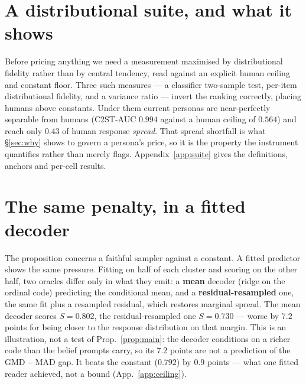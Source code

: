 \documentclass[11pt]{article}
\begin{document}
\section{A distributional suite, and what it shows}
\label{sec:suite}

Before pricing anything we need a measurement maximised by distributional
fidelity rather than by central tendency, read against an explicit human
ceiling and constant floor. Three such measures --- a classifier two-sample
test, per-item distributional fidelity, and a variance ratio --- invert the
ranking correctly, placing humans above constants. Under them current
personas are near-perfectly separable from humans (C2ST-AUC $0.994$ against
a human ceiling of $0.564$) and reach only $0.43$ of human response
\emph{spread}. That spread shortfall is what \S\ref{sec:why} shows to govern
a persona's price, so it is the property the instrument quantifies rather
than merely flags. Appendix~\ref{app:suite} gives the definitions, anchors
and per-cell results.

\section{The same penalty, in a fitted decoder}
\label{sec:encoding}

The proposition concerns a faithful sampler against a constant. A fitted
predictor shows the same pressure. Fitting on half of each cluster and scoring
on the other half, two oracles differ only in what they emit: a \textbf{mean}
decoder (ridge on the ordinal code) predicting the conditional mean, and a
\textbf{residual-resampled} one, the same fit plus a resampled residual, which
restores marginal spread. The mean decoder scores $S=0.802$, the
residual-resampled one $S=0.730$ --- worse by $7.2$ points for being closer to
the response distribution on that margin. This is an illustration, not a test of Prop.~\ref{prop:main}: the decoder
conditions on a richer code than the belief prompts carry, so its $7.2$ points
are not a prediction of the $\mathrm{GMD}-\mathrm{MAD}$ gap. It beats the
constant ($0.792$) by $0.9$ points --- what one fitted reader achieved, not a
bound (App.~\ref{app:ceiling}).


\end{document}
